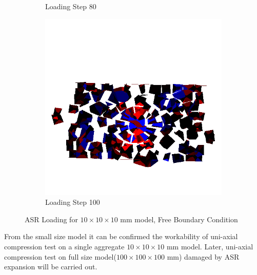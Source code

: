 \begin{figure}[ht!]
\begin{subfigure}{.33\textwidth}
      \caption{Loading Step 80}
      \end{subfigure}%
      \begin{subfigure}{.33\textwidth}
        \centering
        \includegraphics[width=1.0\linewidth]{Files/Small_ASR/Free_IS2/DEP5-STEP(120).png}
        \caption{Loading Step 100}
      \end{subfigure}
  
  \caption{ASR Loading for $10 \times 10 \times 10$ mm model, Free Boundary Condition}
  \label{fig:ASR_Loading_s_free}
\end{figure}

From the small size model it can be confirmed the workability of uni-axial compression test on a single aggregate $10 \times 10 \times 10$ mm model. Later, uni-axial compression test on full size model($100 \times 100 \times 100$ mm) damaged by ASR expansion will be carried out.

